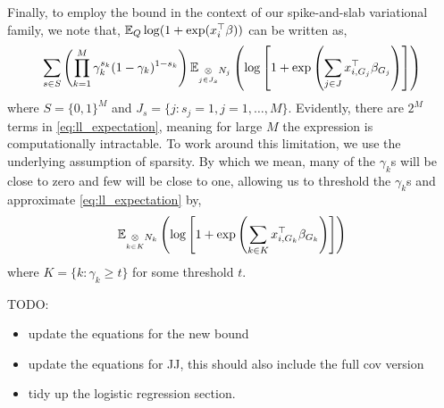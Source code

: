 \break

Finally, to employ the bound in the context of our spike-and-slab variational family, we note that, $\mathbb{E}_Q \log ( 1 + \exp (x_i^\top \beta))$ can be written as,
\begin{equation} \label{eq:ll_expectation}
    \sum_{s \in S} \left( 
	\prod_{k=1}^M \gamma_k^{s_k} (1- \gamma_k )^{1- s_k} 
    \right)
    \mathbb{E}_{\underset{j \in J_s}{\otimes} N_j}
    \left( 
	\log \left[ 1 + \exp \left( \sum_{j \in J} x^\top_{i, G_j} \beta_{G_j} \right) \right] 
    \right)
\end{equation}
where $ S = \{0, 1\}^{M}$ and $J_s = \{j : s_j = 1, j=1,\dots,M \}$. Evidently, there are $2^M$ terms in \eqref{eq:ll_expectation}, meaning for large $M$ the expression is computationally intractable. To work around this limitation, we use the underlying assumption of sparsity. By which we mean, many of the $\gamma_k$s will be close to zero and few will be close to one, allowing us to threshold the $\gamma_k$s and approximate \eqref{eq:ll_expectation} by,
\begin{equation}
    \mathbb{E}_{\underset{k \in K}{\otimes} N_k}
    \left( 
	\log \left[ 1 + \exp \left( \sum_{k \in K} x^\top_{i, G_k} \beta_{G_k} \right) \right] 
    \right)
\end{equation}
where $K = \{k : \gamma_k \geq t \}$ for some threshold $t$.




TODO:
\begin{itemize}
    \itemsep0em
    \item update the equations for the new bound
    \item update the equations for JJ, this should also include the full cov version
    \item tidy up the logistic regression section.
\end{itemize}


